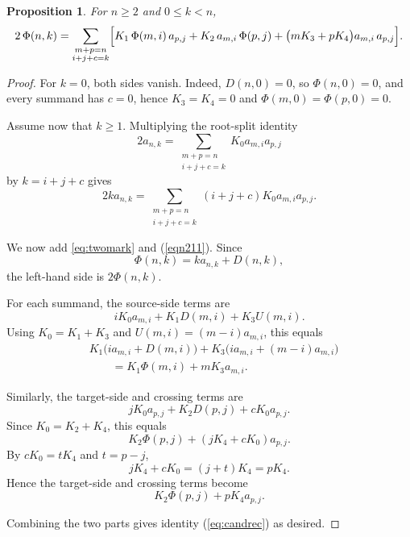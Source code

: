 \documentclass[11pt]{article}
\newtheorem{proposition}[theorem]{Proposition}
\theoremstyle{definition}
\theoremstyle{remark}
\begin{document}
\begin{proposition}\label{prop:candidate}
For $n\ge2$ and $0\le k<n$,
\begin{equation}\label{eq:candrec}
  2\,\Phi(n,k)=\sum_{\substack{m+p=n\\ i+j+c=k}}
  \Bigl[K_1\,\Phi(m,i)\,a_{p, j}+K_2\,a_{m, i}\,\Phi(p,j)
  +\bigl(mK_3+pK_4\bigr)a_{m, i}\,a_{p, j}\Bigr].
\end{equation}
\end{proposition}


\begin{proof}
For $k=0$, both sides vanish. Indeed, $D(n,0)=0$, so
$\Phi(n,0)=0$, and every summand has $c=0$, hence
$K_3=K_4=0$ and $\Phi(m,0)=\Phi(p,0)=0$.

Assume now that $k\ge 1$. Multiplying the root-split identity
\[
2a_{n,k}
=
\sum_{\substack{m+p=n\\ i+j+c=k}}
K_0a_{m,i}a_{p,j}
\]
by $k=i+j+c$ gives
\begin{equation}
2k a_{n,k}
=
\sum_{\substack{m+p=n\\ i+j+c=k}}
(i+j+c)K_0a_{m,i}a_{p,j}.
\label{eqn211}
\end{equation}



We now add   \eqref{eq:twomark} and (\ref{eqn211}). Since
\[
\Phi(n,k)=k a_{n,k}+D(n,k),
\]
the left-hand side is $2\Phi(n,k)$.

For each summand, the source-side terms are
\[
iK_0a_{m,i}+K_1D(m,i)+K_3U(m,i).
\]
Using $K_0=K_1+K_3$ and
$U(m,i)=(m-i)a_{m,i}$, this equals
\[
\begin{aligned}
&K_1\bigl(i a_{m,i}+D(m,i)\bigr)
 +K_3\bigl(i a_{m,i}+(m-i)a_{m,i}\bigr)\\
&\qquad =
K_1\Phi(m,i)+mK_3a_{m,i}.
\end{aligned}
\]

Similarly, the target-side and crossing terms are
\[
jK_0a_{p,j}+K_2D(p,j)+cK_0a_{p,j}.
\]
Since $K_0=K_2+K_4$, this equals
\[
K_2\Phi(p,j)+(jK_4+cK_0)a_{p,j}.
\]
By $cK_0=tK_4$ and $t=p-j$,
\[
jK_4+cK_0=(j+t)K_4=pK_4.
\]
Hence the target-side and crossing terms become
\[
K_2\Phi(p,j)+pK_4a_{p,j}.
\]

Combining the two parts gives identity (\ref{eq:candrec})
as desired.
\end{proof}
\end{document}
